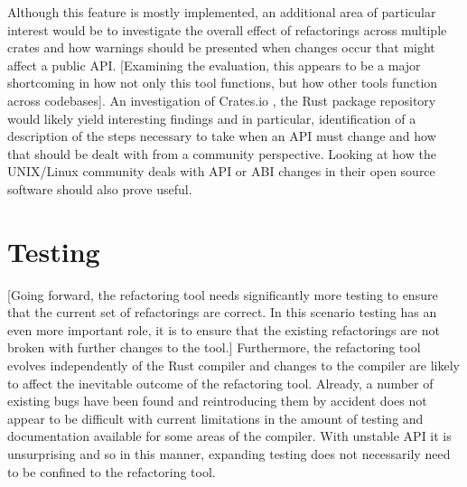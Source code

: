 

Although this feature is mostly implemented, an additional area of particular interest would be to investigate the overall effect of refactorings across multiple crates and how warnings should be presented when changes occur that might affect a public API. [Examining the evaluation, this appears to be a major shortcoming in how not only this tool functions, but how other tools function across codebases]. An investigation of Crates.io \cite{cratesio15}, the Rust package repository would likely yield interesting findings and in particular, identification of a description of the steps necessary to take when an API must change and how that should be dealt with from a community perspective. Looking at how the UNIX/Linux community deals with API or ABI changes in their open source software should also prove useful.

\section{Testing}
[Going forward, the refactoring tool needs significantly more testing to ensure that the current set of refactorings are correct. In this scenario testing has an even more important role, it is to ensure that the existing refactorings are not broken with further changes to the tool.] Furthermore, the refactoring tool evolves independently of the Rust compiler and changes to the compiler are likely to affect the inevitable outcome of the refactoring tool. Already, a number of existing bugs have been found and reintroducing them by accident does not appear to be difficult with current limitations in the amount of testing and documentation available for some areas of the compiler. With unstable API it is unsurprising and so in this manner, expanding testing does not necessarily need to be confined to the refactoring tool. 

